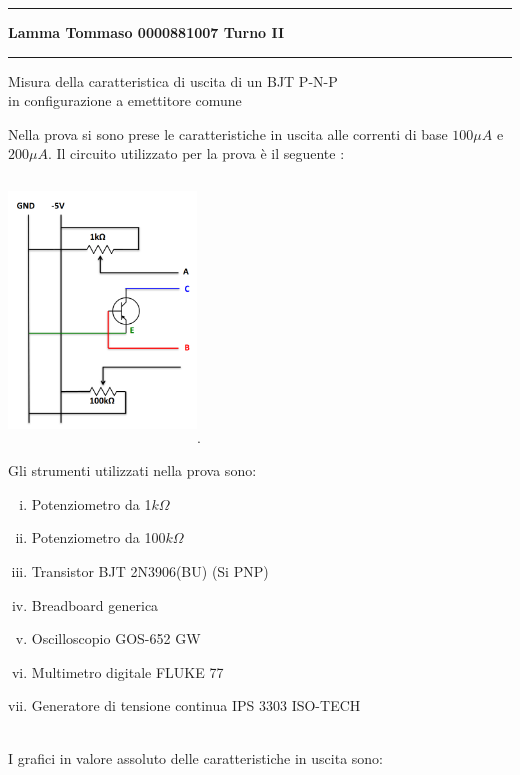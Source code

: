 \documentclass{amsart}
\begin{document}
    \hrule
    \begin{center}
        \textbf{ Lamma    Tommaso    0000881007        Turno    II }\\
    \end{center}
    \hrule
    \begin{center}
        {\huge Misura della caratteristica di uscita di un BJT P-N-P \\ in configurazione a emettitore comune}
    \end{center}
    Nella prova si sono prese le caratteristiche in uscita alle correnti di base $100 \mu A$ e $200 \mu A$.
    Il circuito utilizzato per la prova è il seguente :
    \begin{center}
        \includegraphics[width = 5cm, height = 7cm]{circuito.png}.
    \end{center}
    Gli strumenti utilizzati nella prova sono:
    \begin{enumerate}[(i)]
        \item Potenziometro da 1$k\Omega$
        \item Potenziometro da 100$k\Omega$
        \item Transistor BJT 2N3906(BU) (Si PNP) 
        \item Breadboard generica
        \item Oscilloscopio GOS-652 GW
        \item Multimetro digitale FLUKE 77
        \item Generatore di tensione continua IPS 3303 ISO-TECH
    \end{enumerate}
    \hfill \\
    I grafici in valore assoluto delle caratteristiche in uscita sono:\\
\end{document}
